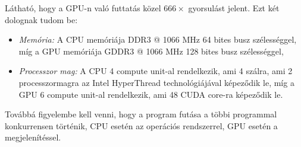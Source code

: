 	\noindent Látható, hogy a GPU-n való futtatás közel $666\times$ gyorsulást jelent.
	Ezt két dolognak tudom be:
	\begin{itemize}
		\item \emph{Memória:} A CPU memóriája DDR3 @ 1066 MHz 64 bites busz szélességgel, míg a GPU
		memóriája GDDR3 @ 1066 MHz 128 bites busz szélességgel,
		\item \emph{Processzor mag:} A CPU 4 compute unit-al rendelkezik, ami 4 szálra, ami 2
		processzormagra az Intel HyperThread technológiájával képeződik le, míg a GPU 6 compute unit-al
		rendelkezik, ami 48 CUDA core-ra képeződik le.
	\end{itemize}
	Továbbá figyelembe kell venni, hogy a program futása a többi programmal konkurrensen történik, CPU
	esetén az operációs rendszerrel, GPU esetén a megjelenítéssel.
	


